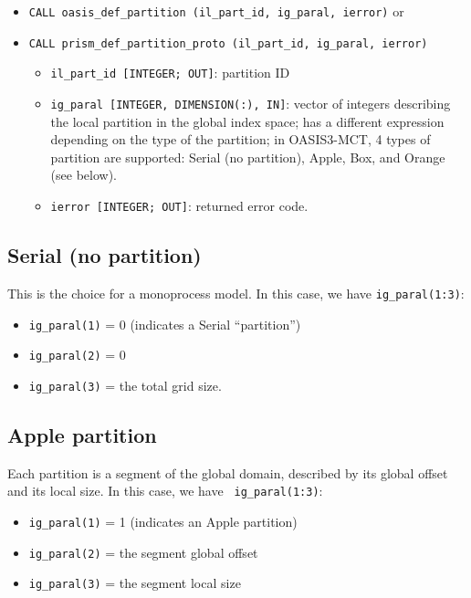 \begin{itemize}

\vspace{0.2cm}
\item {\tt CALL oasis\_def\_partition        (il\_part\_id, ig\_paral, ierror)}
 or 
\item {\tt CALL prism\_def\_partition\_proto (il\_part\_id, ig\_paral, ierror)}

   \begin{itemize}
   \item {\tt il\_part\_id [INTEGER; OUT]}: partition ID 
   \item {\tt ig\_paral [INTEGER, DIMENSION(:), IN]}: vector of
   integers describing the local partition in the global index space; has a different expression depending on the type of the
partition; in OASIS3-MCT, 4 types of partition are supported: Serial (no
partition), Apple, Box, and Orange (see below).
   \item {\tt ierror [INTEGER; OUT]}: returned error code.
   \end{itemize}
\end{itemize} 

\subsection{Serial (no partition)}

This is the choice for a monoprocess model. In this case, we have 
{\tt ig\_paral(1:3)}:
\begin{itemize}
 \item {\tt ig\_paral(1)} = 0 (indicates a Serial ``partition'')
 \item {\tt ig\_paral(2)} = 0
 \item {\tt ig\_paral(3)} = the total grid size.
\end{itemize}

\subsection{Apple partition} 

Each partition is a segment of the global domain, described by its
global offset and its local size. In this case, we have {\tt
ig\_paral(1:3)}:
\begin{itemize}
 \item {\tt ig\_paral(1)} = 1 (indicates an Apple partition)
 \item {\tt ig\_paral(2)} = the segment global offset
 \item {\tt ig\_paral(3)} = the segment local size
\end{itemize}

